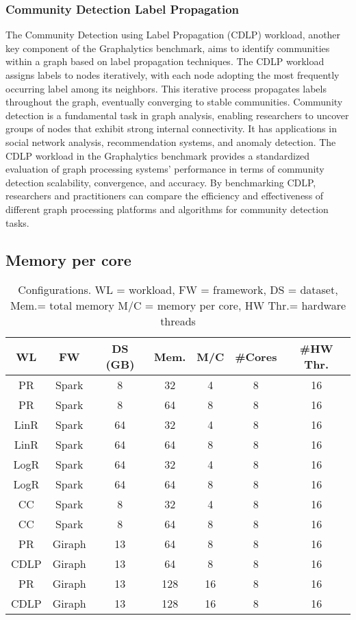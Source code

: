 \subsubsection{Community Detection Label Propagation}
The Community Detection using Label Propagation (CDLP) workload, another key component of the Graphalytics benchmark, aims to identify communities within a graph based on label propagation techniques. The CDLP workload assigns labels to nodes iteratively, with each node adopting the most frequently occurring label among its neighbors. This iterative process propagates labels throughout the graph, eventually converging to stable communities. Community detection is a fundamental task in graph analysis, enabling researchers to uncover groups of nodes that exhibit strong internal connectivity. It has applications in social network analysis, recommendation systems, and anomaly detection. The CDLP workload in the Graphalytics benchmark provides a standardized evaluation of graph processing systems' performance in terms of community detection scalability, convergence, and accuracy. By benchmarking CDLP, researchers and practitioners can compare the efficiency and effectiveness of different graph processing platforms and algorithms for community detection tasks.

\subsection{Memory per core}

\begin{table}[thbp]
  \centering
  \caption{Configurations. WL = workload, FW = framework, DS = dataset, Mem.= total memory M/C = memory per core, HW Thr.= hardware threads}
  \label{tab:setups}
  \begin{tabular}{|c|c|c|c|c|c|c|}
    \hline
	  \textbf{WL} & \textbf{FW} & \textbf{DS (GB)} & \textbf{Mem.} & \textbf{M/C} & \textbf{#Cores} & \textbf{#HW Thr.}\\
    \hline
	  PR & Spark & 8 & 32 & 4 & 8 & 16\\
	  PR & Spark & 8 & 64 & 8 & 8 & 16\\
	  LinR & Spark & 64 & 32 & 4 & 8 & 16\\
	  LinR & Spark & 64 & 64 & 8 & 8 & 16\\
	  LogR & Spark & 64 & 32 & 4 & 8 & 16\\
	  LogR & Spark & 64 & 64 & 8 & 8 & 16\\
	  CC & Spark & 8 & 32 & 4 & 8 & 16\\
	  CC & Spark & 8 & 64 & 8 & 8 & 16\\
	  PR & Giraph & 13 & 64 & 8 & 8 & 16\\
	  CDLP & Giraph & 13 & 64 & 8 & 8 & 16\\
	  PR & Giraph & 13 & 128 & 16 & 8 & 16\\
	  CDLP & Giraph & 13 & 128 & 16 & 8 & 16\\
    \hline
  \end{tabular}
\end{table}

